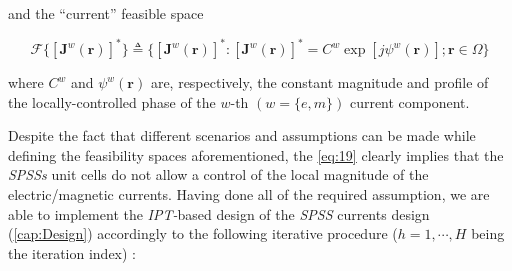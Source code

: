 and the {}``current'' feasible space

\begin{equation}
\mathcal{F}\{[\mathbf{J}^{w}(\mathbf{r})]^{*}\}\triangleq\{[\mathbf{J}^{w}(\mathbf{r})]^{*}:[\mathbf{J}^{w}(\mathbf{r})]^{*}=C^{w}\exp[j\psi^{w}(\mathbf{r})];\mathbf{r}\in\Omega\}\label{eq:19}\end{equation}


where $C^{w}$ and $\psi^{w}(\mathbf{r})$ are, respectively, the
constant magnitude and profile of the locally-controlled phase of
the $w$-th $(w=\{ e,m\})$ current component.

Despite the fact that different scenarios and assumptions can be made
while defining the feasibility spaces aforementioned, the \ref{eq:19}
clearly implies that the \emph{SPSSs} unit cells do not allow a control
of the local magnitude of the electric/magnetic currents. Having done
all of the required assumption, we are able to implement the \emph{IPT-}based
design of the \emph{SPSS} currents design (\ref{cap:Design}) accordingly
to the following iterative procedure ($h=1,\cdots,H$ being the iteration
index) :

